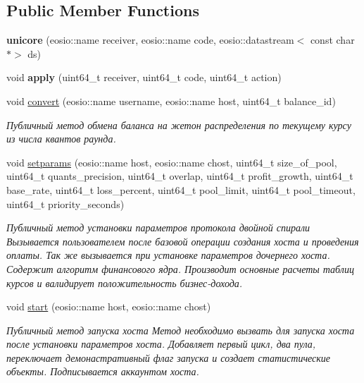 \subsection*{Public Member Functions}
\begin{DoxyCompactItemize}
\item 
\mbox{\label{classunicore_a8f1c99385890a2fe4645c4af8e7fcfc7}} 
{\bfseries unicore} (eosio\+::name receiver, eosio\+::name code, eosio\+::datastream$<$ const char $\ast$$>$ ds)
\item 
\mbox{\label{classunicore_added73f623a6df0537a4daef1c46ed8b}} 
void {\bfseries apply} (uint64\+\_\+t receiver, uint64\+\_\+t code, uint64\+\_\+t action)
\item 
\mbox{\label{classunicore_a30206473eb9672b7b67d0a85d2035ff3}} 
void \mbox{\hyperlink{classunicore_a30206473eb9672b7b67d0a85d2035ff3}{convert}} (eosio\+::name username, eosio\+::name host, uint64\+\_\+t balance\+\_\+id)
\begin{DoxyCompactList}\small\item\em Публичный метод обмена баланса на жетон распределения по текущему курсу из числа квантов раунда. \end{DoxyCompactList}\item 
void \mbox{\hyperlink{classunicore_accfb2e432f24f46fe7432110f0361d2f}{setparams}} (eosio\+::name host, eosio\+::name chost, uint64\+\_\+t size\+\_\+of\+\_\+pool, uint64\+\_\+t quants\+\_\+precision, uint64\+\_\+t overlap, uint64\+\_\+t profit\+\_\+growth, uint64\+\_\+t base\+\_\+rate, uint64\+\_\+t loss\+\_\+percent, uint64\+\_\+t pool\+\_\+limit, uint64\+\_\+t pool\+\_\+timeout, uint64\+\_\+t priority\+\_\+seconds)
\begin{DoxyCompactList}\small\item\em Публичный метод установки параметров протокола двойной спирали Вызывается пользователем после базовой операции создания хоста и проведения оплаты. Так же вызывается при установке параметров дочернего хоста. Содержит алгоритм финансового ядра. Производит основные расчеты таблиц курсов и валидирует положительность бизнес-\/дохода. \end{DoxyCompactList}\item 
void \mbox{\hyperlink{classunicore_ad83b75f3c4afd1ab954d428be8f6f7d7}{start}} (eosio\+::name host, eosio\+::name chost)
\begin{DoxyCompactList}\small\item\em Публичный метод запуска хоста Метод необходимо вызвать для запуска хоста после установки параметров хоста. Добавляет первый цикл, два пула, переключает демонастративный флаг запуска и создает статистические объекты. Подписывается аккаунтом хоста. \end{DoxyCompactList}\item 
$$
\end{DoxyCompactItemize}
